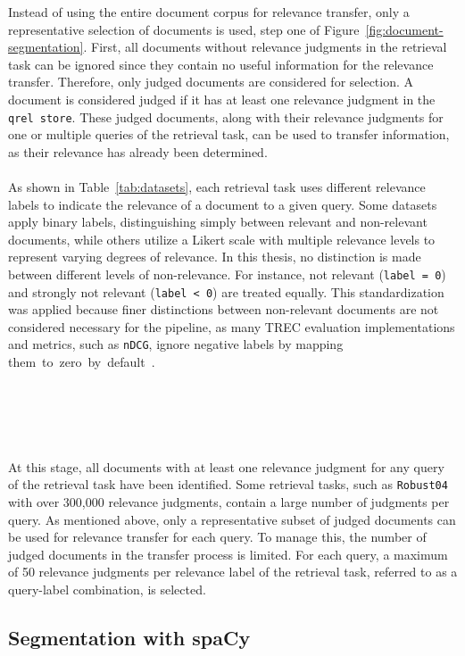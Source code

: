 Instead of using the entire document corpus for relevance transfer, only a representative selection of documents is used, step one of Figure~\ref{fig:document-segmentation}. First, all documents without relevance judgments in the retrieval task can be ignored since they contain no useful information for the relevance transfer. Therefore, only judged documents are considered for selection. A document is considered judged if it has at least one relevance judgment in the \texttt{qrel store}. These judged documents, along with their relevance judgments for one or multiple queries of the retrieval task, can be used to transfer information, as their relevance has already been determined.
\\\\
As shown in Table~\ref{tab:datasets}, each retrieval task uses different relevance labels to indicate the relevance of a document to a given query. Some datasets apply binary labels, distinguishing simply between relevant and non-relevant documents, while others utilize a Likert scale with multiple relevance levels to represent varying degrees of relevance. In this thesis, no distinction is made between different levels of non-relevance. For instance, \glqq not relevant\grqq{} \mbox{(\texttt{label = 0})} and \glqq strongly not relevant\grqq{} (\texttt{label < 0}) are treated equally. This standardization was applied because finer distinctions between non-relevant documents are not considered necessary for the pipeline, as many TREC evaluation implementations and metrics, such as \texttt{nDCG}, ignore negative labels by mapping \mbox{them to zero by default \cite{gienapp:2020}}.
\\\\\\\\\\\\
At this stage, all documents with at least one relevance judgment for any query of the retrieval task have been identified. Some retrieval tasks, such as \texttt{Robust04} with over 300,000 relevance judgments, contain a large number of judgments per query. As mentioned above, only a representative subset of judged documents can be used for relevance transfer for each query. To manage this, the number of judged documents in the transfer process is limited. For each query, a maximum of 50 relevance judgments per relevance label of the retrieval task, referred to as a query-label combination, is selected.

\subsection{Segmentation with spaCy}\label{segmentation-with-spacy}

